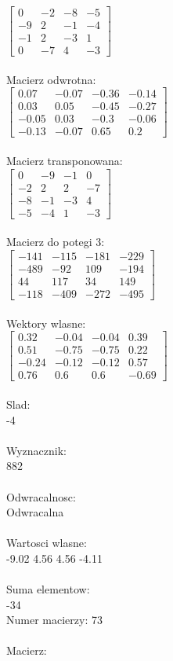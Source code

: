 \documentclass[a4paper,12pt]{article}
\begin{document}
$\begin{bmatrix} 0&-2&-8&-5\\-9&2&-1&-4\\-1&2&-3&1\\0&-7&4&-3 \end{bmatrix}$
\\
\\
Macierz odwrotna:\\

$\begin{bmatrix} 0.07&-0.07&-0.36&-0.14\\0.03&0.05&-0.45&-0.27\\-0.05&0.03&-0.3&-0.06\\-0.13&-0.07&0.65&0.2 \end{bmatrix}$
\\
\\
Macierz transponowana:\\

$\begin{bmatrix} 0&-9&-1&0\\-2&2&2&-7\\-8&-1&-3&4\\-5&-4&1&-3 \end{bmatrix}$
\\
\\
Macierz do potegi 3:\\

$\begin{bmatrix} -141&-115&-181&-229\\-489&-92&109&-194\\44&117&34&149\\-118&-409&-272&-495 \end{bmatrix}$
\\
\\
Wektory wlasne:\\

$\begin{bmatrix} 0.32&-0.04&-0.04&0.39\\0.51&-0.75&-0.75&0.22\\-0.24&-0.12&-0.12&0.57\\0.76&0.6&0.6&-0.69 \end{bmatrix}$
\\
\\
Slad:\\
-4
\\
\\
Wyznacznik:\\
882
\\
\\
Odwracalnosc:\\
Odwracalna
\\
\\
Wartosci wlasne:\\
-9.02 4.56 4.56 -4.11
\\
\\
Suma elementow:\\
-34
\\
\newpage
Numer macierzy:
73
\\
\\
Macierz:\\
\end{document}
